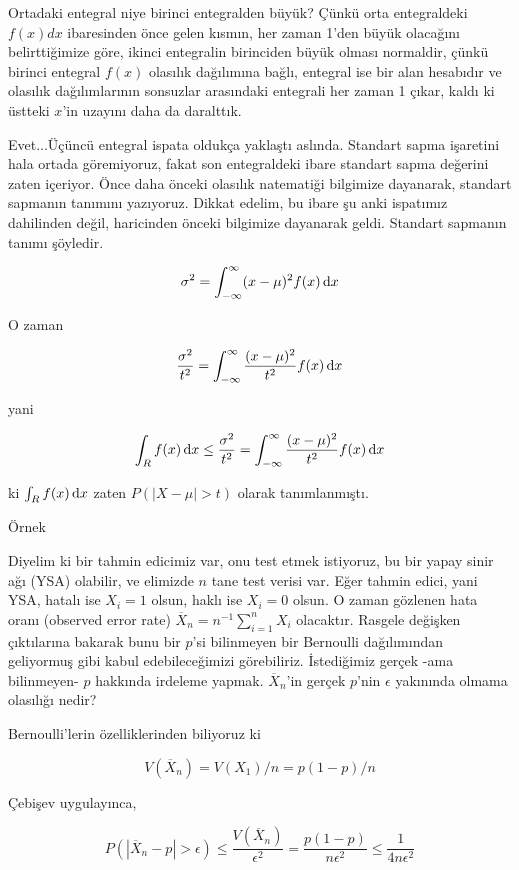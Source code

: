 \documentclass[12pt,fleqn]{article}\usepackage{../../common}
\begin{document}
Ortadaki entegral niye birinci entegralden büyük? Çünkü orta entegraldeki
$f(x)dx$ ibaresinden önce gelen kısmın, her zaman 1'den büyük olacağını
belirttiğimize göre, ikinci entegralin birinciden büyük olması normaldir,
çünkü birinci entegral $f(x)$ olasılık dağılımına bağlı, entegral ise bir
alan hesabıdır ve olasılık dağılımlarının sonsuzlar arasındaki entegrali
her zaman 1 çıkar, kaldı ki üstteki $x$'in uzayını daha da daralttık.

Evet...Üçüncü entegral ispata oldukça yaklaştı aslında. Standart sapma
işaretini hala ortada göremiyoruz, fakat son entegraldeki ibare standart
sapma değerini zaten içeriyor. Önce daha önceki olasılık natematiği
bilgimize dayanarak, standart sapmanın tanımını yazıyoruz. Dikkat edelim,
bu ibare şu anki ispatımız dahilinden değil, haricinden önceki bilgimize
dayanarak geldi. Standart sapmanın tanımı şöyledir.

$$ \sigma^2 = \int_{-\infty}^{\infty} (x-\mu)^2f(x) \,\mathrm{d} x $$

O zaman

$$
\frac{\sigma^2}{t^2}
= \int_{-\infty}^{\infty}\frac{(x-\mu)^2}{t^2}f(x)\,\mathrm{d} x
$$

yani

$$
\int_R f(x) \,\mathrm{d} x \le \frac{\sigma^2}{t^2} = 
\int_{-\infty}^{\infty} \frac{(x-\mu)^2}{t^2}f(x) \,\mathrm{d} x
$$

ki $\int_R f(x) \,\mathrm{d} x$ zaten $P(|X-\mu| > t)$ olarak tanımlanmıştı. 

Örnek

Diyelim ki bir tahmin edicimiz var, onu test etmek istiyoruz, bu bir yapay
sinir ağı (YSA) olabilir, ve elimizde $n$ tane test verisi var. Eğer tahmin
edici, yani YSA, hatalı ise $X_i=1$ olsun, haklı ise $X_i=0$ olsun. O zaman
gözlenen hata oranı (observed error rate)
$\overline{X}_n = n^{-1}\sum_{i=1}^{n} X_i$ olacaktır. Rasgele değişken
çıktılarına bakarak bunu bir $p$'si bilinmeyen bir Bernoulli dağılımından
geliyormuş gibi kabul edebileceğimizi görebiliriz. İstediğimiz gerçek -ama
bilinmeyen- $p$ hakkında irdeleme yapmak. $\overline{X}_n$'in gerçek
$p$'nin $\epsilon$ yakınında olmama olasılığı nedir?

Bernoulli'lerin özelliklerinden biliyoruz ki 

$$ V(\overline{X}_n) = V(X_1) / n = p(1-p)/n$$

Çebişev uygulayınca, 

$$ 
P(|\overline{X}_n - p| > \epsilon) \le \frac{V(\overline{X}_n)}{\epsilon^2}
= \frac{p(1-p)}{n\epsilon^2} \le \frac{1}{4n\epsilon^2}
$$
\end{document}
